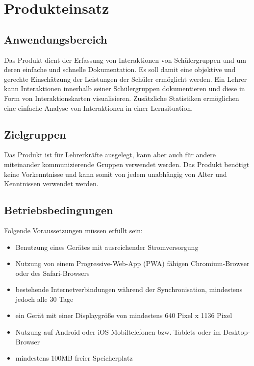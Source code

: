 \section{Produkteinsatz}
    \subsection{Anwendungsbereich}
    Das Produkt dient der Erfassung von Interaktionen von Schülergruppen und um deren einfache und schnelle Dokumentation. Es soll damit eine objektive und gerechte Einschätzung der Leistungen der Schüler ermöglicht werden. Ein Lehrer kann Interaktionen innerhalb seiner Schülergruppen dokumentieren und diese in Form von Interaktionskarten visualisieren. Zusätzliche Statistiken ermöglichen eine einfache Analyse von Interaktionen in einer Lernsituation.
    
    \subsection{Zielgruppen}
    Das Produkt ist für Lehrerkräfte ausgelegt, kann aber auch für andere miteinander kommunizierende Gruppen verwendet werden. Das Produkt benötigt keine Vorkenntnisse und kann somit von jedem unabhängig von Alter und Kenntnissen verwendet werden.
    
    \subsection{Betriebsbedingungen}
    Folgende Voraussetzungen müssen erfüllt sein:

    \singlespacing
    \begin{itemize}
        \item Benutzung eines Gerätes mit ausreichender Stromversorgung
        \item Nutzung von einem Progressive-Web-App (\Gls{PWA}) fähigen \Gls{Chromium}-\Gls{Browser} oder des \Gls{Safari}-Browsers
        \item bestehende Internetverbindungen während der \Gls{Synchronisation}, mindestens jedoch alle 30 Tage
        \item ein Gerät mit einer \Gls{Display}größe von mindestens 640 Pixel x 1136 Pixel
        \item Nutzung auf \Gls{Android} oder \gls{iOS} Mobiltelefonen bzw. Tablets oder im \Gls{Desktop}-\Gls{Browser}
        \item mindestens 100MB freier Speicherplatz
    \end{itemize}
    \onehalfspacing